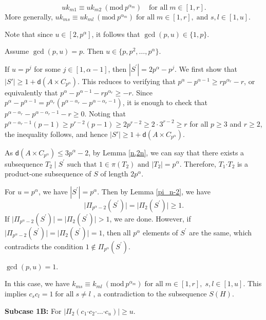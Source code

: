\documentclass[a4paper,11pt]{article}
\numberwithin{equation}{section}
\newcommand{\bdot}{\boldsymbol{\cdot}}
\newcommand{\no}{\noindent}
\begin{document}
$$uk_{m1} \equiv uk_{m2}\ (\textrm{mod}\ p^{\alpha_m})\quad\text{for all}\; m \in [1, r].$$
More generally, $uk_{ms} \equiv uk_{ml}\ (\textrm{mod}\ p^{\alpha_m}) \;\text{for all}\; m\in [1,r],\;\text{and } s,l\in [1,u].$

\no Note that since $ u \in [2,p^{\alpha}]$, it follows that $\gcd(p,u) \in \{1,p\}$.

\no {\bf Subcase 1A (i):} Assume $\gcd(p,u)=p$. Then $u \in \{p,p^2,\dotsc,p^{\alpha}\}$. 

\no If $u=p^j$ for some $ j \in [1,\alpha-1]$, then $|S^{\prime}|= 2p^{\alpha}-p^j.$ 
We first show that $|S'| \ge 1 + \mathsf{d}(A \times C_{p^{\alpha}})$. This reduces to verifying that $p^{\alpha} - p^{\alpha-1} \ge r p^{\alpha_r} - r$, or equivalently that $p^{\alpha} - p^{\alpha-1} - r p^{\alpha_r} \ge -r$. Since $p^{\alpha} - p^{\alpha-1} = p^{\alpha_r}(p^{\alpha-\alpha_r} - p^{\alpha-\alpha_r-1})$, it is enough to check that $p^{\alpha-\alpha_r} - p^{\alpha-\alpha_r-1} - r \ge 0$. Noting that $p^{\alpha-\alpha_r-1}(p-1) \ge p^{r-2}(p-1) \ge 2p^{r-2} \ge 2\cdot 3^{r-2} \ge r$ for all $p \ge 3$ and $r \ge 2$, the inequality follows, and hence $|S'| \ge 1 + \mathsf{d}(A \times C_{p^{\alpha}})$.

As $\mathsf{d}(A \times C_{p^{\alpha}})\le 3p^{\alpha}-2$, by Lemma \ref{n,2n}, we can say that there exists a subsequence $T_2 \mid S^{\prime} \text{ such that } 1\in \pi(T_2) \text{ and } |T_2|= p^{\alpha}.$ Therefore, $T_1 \bdot T_2$ is a product-one subsequence of $S$ of length $2p^{\alpha}$.


\no For $u=p^{\alpha}$, we have $|S^{\prime}|=p^{\alpha}$. Then by Lemma \ref{pi_n-2}, we have 
$$\big|\Pi_{p^{\alpha}-2}(S^{\prime})\big|=\big|\Pi_{2}(S^{\prime})\big| \ge 1.$$
If $\big|\Pi_{p^{\alpha}-2}(S^{\prime})\big|=\big|\Pi_{2}(S^{\prime})\big| > 1$, we are done. However, if $\big|\Pi_{p^{\alpha}-2}(S^{\prime})\big|=\big|\Pi_{2}(S^{\prime})\big|= 1$, then all $p^{\alpha}$ elements of $S^{\prime}$ are the same, which contradicts the condition $1 \notin \Pi_{p^{\alpha}}(S^{\prime})$.

\no {\bf Subcase 1A (ii):} $\gcd(p,u)=1$.

\no In this case, we have $k_{ms} \equiv k_{ml}\ (\textrm{mod}\ p^{\alpha_m})\;\text{for all}\; m \in [1, r],\; s,l \in [1, u]$. This implies $c_sc_l=1 \;\text{for all}\;  s\neq l$ , a contradiction to the subsequence $S(H)$.

\noindent \textbf{Subcase 1B:} For $\big|\Pi_2(c_1 \bdot c_2\bdot \dotsc \bdot c_u)\big| \ge u$.
\end{document}
